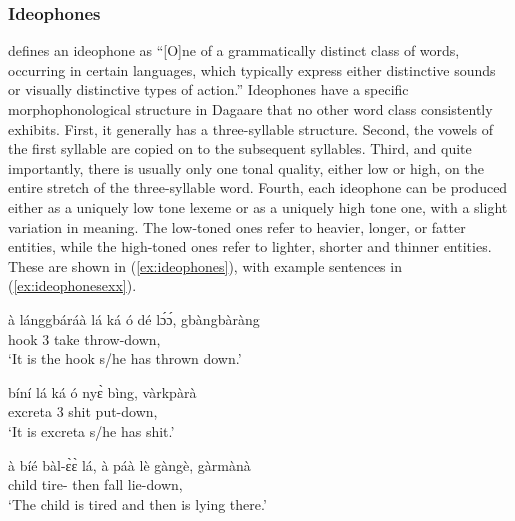 \subsubsection{Ideophones}
\citet[131--132]{Trask1993} defines an ideophone as ``[O]ne of a grammatically distinct
class of words, occurring in certain languages, which typically express either distinctive
sounds or visually distinctive types of action.'' Ideophones have a specific morphophonological structure in Dagaare that no other word class consistently exhibits.
First, it generally has a three-syllable structure. Second, the vowels of the first syllable are
copied on to the subsequent syllables. Third, and quite importantly, there is usually only one
tonal quality, either low or high, on the entire stretch of the three-syllable word. Fourth, each
ideophone can be produced either as a uniquely low tone lexeme or as a uniquely high tone
one, with a slight variation in meaning. The low-toned ones refer to heavier, longer, or fatter
entities, while the high-toned ones refer to lighter, shorter and thinner entities. These are
shown in (\ref{ex:ideophones}), with example sentences in (\ref{ex:ideophonesexx}).



\ea
\label{ex:ideophonesexx} 
    \ea
    \gll  à lánggbáráà lá ká ó dé lɔ́ɔ́, gbàngbàràng\\
    {\DEF} hook {\TOP} {\COMP} 3{\SG} take throw-down, {\IDPH}\\
    \glt ‘It is the hook s/he has thrown down.’

    \ex
    \gll bíní lá ká ó nyɛ̀ bìng, vàrkpàrà\\
    excreta {\TOP} {\COMP} 3{\SG} shit put-down, {\IDPH}\\
    \glt ‘It is excreta s/he has shit.’

    \ex
    \gll à bíé bàl-ɛ̀ɛ̀ lá, à páà lè gàngè, gàrmànà\\
    {\DEF} child tire-{\PFV} {\FOC} {\DEF} then fall lie-down, {\IDPH}\\
    \glt ‘The child is tired and then is lying there.’

